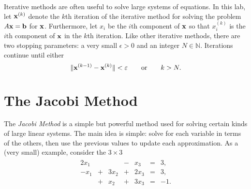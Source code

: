 \label{lab:iter_methods}



Iterative methods are often useful to solve large systems of equations.
In this lab, let $\mathbf{x}^{(k)}$ denote the $k$th iteration of the iterative method for solving the problem $A\mathbf{x}=\mathbf{b}$ for $\mathbf{x}$.
Furthermore, let $x_{i}$ be the $i$th component of $\mathbf{x}$ so that $x_{i}^{(k)}$ is the $i$th component of $\mathbf{x}$ in the $k$th iteration.
Like other iterative methods, there are two stopping parameters: a very small $\epsilon > 0$ and an integer $N\in\mathbb{N}$.
Iterations continue until either
\begin{equation} %
\|\x^{(k-1)}-\x^{(k)}\| < \epsilon
\qquad \text{or} \qquad
k > N.
\label{stopping-criteria}
\end{equation}

\section*{The Jacobi Method} %

The \emph{Jacobi Method} is a simple but powerful method used for solving certain kinds of large linear systems.
The main idea is simple: solve for each variable in terms of the others, then use the previous values to update each approximation.
As a (very small) example, consider the $3 \times 3$
\begin{align*}
\begin{array}{ccccccr}
  2x_1 &   &      & - & x_3  & = & 3,  \\
  -x_1 & + & 3x_2 & + & 2x_3 & = & 3,  \\
       & + & x_2  & + & 3x_3 & = & -1. \\
\end{array}
\end{align*}


